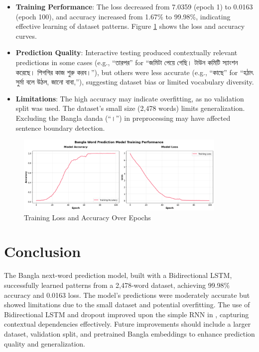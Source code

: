 \documentclass[12pt]{article}
\begin{document}
\begin{itemize}
    \item \textbf{Training Performance}: The loss decreased from 7.0359 (epoch 1) to 0.0163 (epoch 100), and accuracy increased from 1.67\% to 99.98\%, indicating effective learning of dataset patterns. Figure \ref{fig:training_plots} shows the loss and accuracy curves.
    \item \textbf{Prediction Quality}: Interactive testing produced contextually relevant predictions in some cases (e.g., {\bengalifont ``তারপর''} for {\bengalifont ``জমিটা পেয়ে গেছি। টাউন কমিটি স্যাংশন করেছে। শিগগির কাজ শুরু করব।''}), but others were less accurate (e.g., {\bengalifont ``কাছে''} for {\bengalifont ``হঠাৎ সুর্মা বলে উঠল, জানো বাবা,''}), suggesting dataset bias or limited vocabulary diversity.
    \item \textbf{Limitations}: The high accuracy may indicate overfitting, as no validation split was used. The dataset's small size (2,478 words) limits generalization. Excluding the Bangla danda ({\bengalifont ``।''}) in preprocessing may have affected sentence boundary detection.
\end{itemize}

\begin{figure}[H]
    \centering
    \caption{Training Loss and Accuracy Over Epochs}
    \label{fig:training_plots}
    \includegraphics[width=0.9\textwidth]{curves.png}
\end{figure}

\section{Conclusion}
The Bangla next-word prediction model, built with a Bidirectional LSTM, successfully learned patterns from a 2,478-word dataset, achieving 99.98\% accuracy and 0.0163 loss. The model's predictions were moderately accurate but showed limitations due to the small dataset and potential overfitting. The use of Bidirectional LSTM and dropout improved upon the simple RNN in \cite{singh2024}, capturing contextual dependencies effectively. Future improvements should include a larger dataset, validation split, and pretrained Bangla embeddings to enhance prediction quality and generalization.
\end{document}
